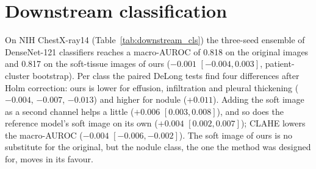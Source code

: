 \section{Downstream classification}
On NIH ChestX-ray14 (Table~\ref{tab:downstream_cls}) the three-seed ensemble of DenseNet-121 classifiers reaches a macro-AUROC of 0.818 on the
original images and 0.817 on the soft-tissue images of ours ($-0.001$ $[-0.004,0.003]$, patient-cluster bootstrap). Per class the paired
DeLong tests find four differences after Holm correction: ours is lower for effusion, infiltration and pleural thickening ($-0.004$, $-0.007$,
$-0.013$) and higher for nodule ($+0.011$). Adding the soft image as a second channel helps a little ($+0.006$ $[0.003,0.008]$), and so does the
reference model's soft image on its own ($+0.004$ $[0.002,0.007]$); CLAHE lowers the macro-AUROC ($-0.004$ $[-0.006,-0.002]$). The soft image
of ours is no substitute for the original, but the nodule class, the one the method was designed for, moves in its favour.
\begin{table}[htbp]
\centering\small
\caption{Downstream classification on NIH ChestX-ray14: macro-AUROC of the three-seed ensemble, per-seed mean $\pm$ SD and the difference to
the original image (patient-cluster bootstrap).}
\label{tab:downstream_cls}
\end{table}

